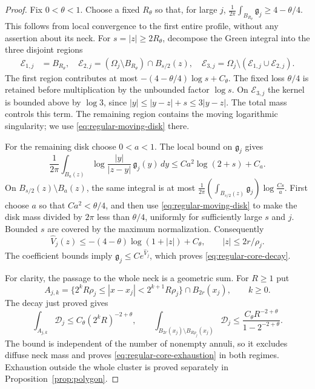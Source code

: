 \documentclass[11pt,reqno]{amsart}
\numberwithin{equation}{section}
\theoremstyle{definition}
\theoremstyle{remark}
\begin{document}
\begin{proof}
Fix $0<\theta<1$. Choose a fixed $R_\theta$ so that, for large $j$,
\(
 \frac1{2\pi}\int_{B_{R_\theta}}\mathfrak g_j
       \ge4-\theta/4.
\)
This follows from local convergence to the first entire profile,
without any assertion about its neck. For $s=|z|\ge2R_\theta$,
decompose the Green integral into the three disjoint regions
\[
 \begin{split}
 \mathcal E_{1,j}&=B_{R_\theta},\quad
 \mathcal E_{2,j}=(\Omega_j\setminus B_{R_\theta})\cap B_{s/2}(z),\quad
 \mathcal E_{3,j}=\Omega_j\setminus
                         (\mathcal E_{1,j}\cup\mathcal E_{2,j}).
 \end{split}
\]
The first region contributes at most
$-(4-\theta/4)\log s+C_\theta$. The fixed loss $\theta/4$ is retained
before multiplication by the unbounded factor $\log s$.
On $\mathcal E_{3,j}$ the kernel is bounded above by $\log3$,
since $|y|\le|y-z|+s\le3|y-z|$. The total mass controls this term.
The remaining region contains the moving logarithmic singularity;
we use \eqref{eq:regular-moving-disk} there.

For the remaining disk choose $0<a<1$. The local bound on
$\mathfrak g_j$ gives
\[
 \frac1{2\pi}\int_{B_a(z)}
       \log\frac{|y|}{|z-y|}\,\mathfrak g_j(y)\,dy
       \le Ca^2\log(2+s)+C_a.
\]
On $B_{s/2}(z)\setminus B_a(z)$, the same integral is at most
\(
 \frac1{2\pi}\left(\int_{B_{s/2}(z)}\mathfrak g_j\right)
                   \log\frac{Cs}{a}.
\)
First choose $a$ so that $Ca^2<\theta/4$, and then use
\eqref{eq:regular-moving-disk} to make the disk mass divided by
$2\pi$ less than $\theta/4$, uniformly for sufficiently large $s$
and $j$. Bounded $s$ are covered by the maximum normalization.
Consequently
\[
 \widehat V_j(z)\le-(4-\theta)\log(1+|z|)+C_\theta,
 \qquad |z|\le2r/\rho_j.
\]
The coefficient bounds imply $\mathfrak g_j\le C e^{\widehat V_j}$,
which proves \eqref{eq:regular-core-decay}.

For clarity, the passage to the whole neck is a geometric sum.
For $R\ge1$ put
\[
 A_{j,k}=\{2^kR\rho_j\le |x-x_j|<2^{k+1}R\rho_j\}
                 \cap B_{2r}(x_j),\qquad k\ge0.
\]
The decay just proved gives
\begin{equation}\label{eq:regular-dyadic-neck}
 \int_{A_{j,k}}\mathcal D_j
       \le C_\theta(2^kR)^{-2+\theta},\qquad
 \int_{B_{2r}(x_j)\setminus B_{R\rho_j}(x_j)}\mathcal D_j
       \le \frac{C_\theta R^{-2+\theta}}{1-2^{-2+\theta}}.
\end{equation}
The bound is independent of the number of nonempty annuli, so it
excludes diffuse neck mass and proves \eqref{eq:regular-core-exhaustion}
in both regimes. Exhaustion outside the whole cluster is proved
separately in Proposition~\ref{prop:polygon}.


\end{proof}
\end{document}
